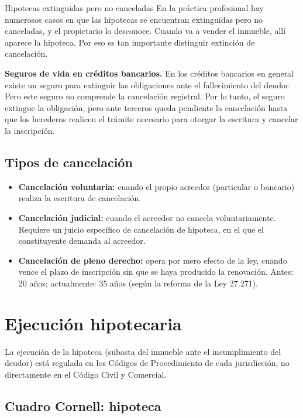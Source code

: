 \documentclass[12pt,oneside]{book}
\begin{document}
\begin{example}{Hipotecas extinguidas pero no canceladas}
En la práctica profesional hay numerosos casos en que las hipotecas se encuentran extinguidas pero no canceladas, y el propietario lo desconoce. Cuando va a vender el inmueble, allí aparece la hipoteca. Por eso es tan importante distinguir extinción de cancelación.
\end{example}

\begin{note}
\textbf{Seguros de vida en créditos bancarios.} En los créditos bancarios en general existe un seguro para extinguir las obligaciones ante el fallecimiento del deudor. Pero este seguro no comprende la cancelación registral. Por lo tanto, el seguro extingue la obligación, pero ante terceros queda pendiente la cancelación hasta que los herederos realicen el trámite necesario para otorgar la escritura y cancelar la inscripción.
\end{note}

\subsection{Tipos de cancelación}

\begin{itemize}
    \item \textbf{Cancelación voluntaria:} cuando el propio acreedor (particular o bancario) realiza la escritura de cancelación.
    \item \textbf{Cancelación judicial:} cuando el acreedor no cancela voluntariamente. Requiere un juicio específico de cancelación de hipoteca, en el que el constituyente demanda al acreedor.
    \item \textbf{Cancelación de pleno derecho:} opera por mero efecto de la ley, cuando vence el plazo de inscripción sin que se haya producido la renovación. Antes: 20 años; actualmente: 35 años (según la reforma de la Ley 27.271).
\end{itemize}

\section{Ejecución hipotecaria}

La ejecución de la hipoteca (subasta del inmueble ante el incumplimiento del deudor) está regulada en los Códigos de Procedimiento de cada jurisdicción, no directamente en el Código Civil y Comercial.

\subsection*{Cuadro Cornell: hipoteca}
\end{document}

